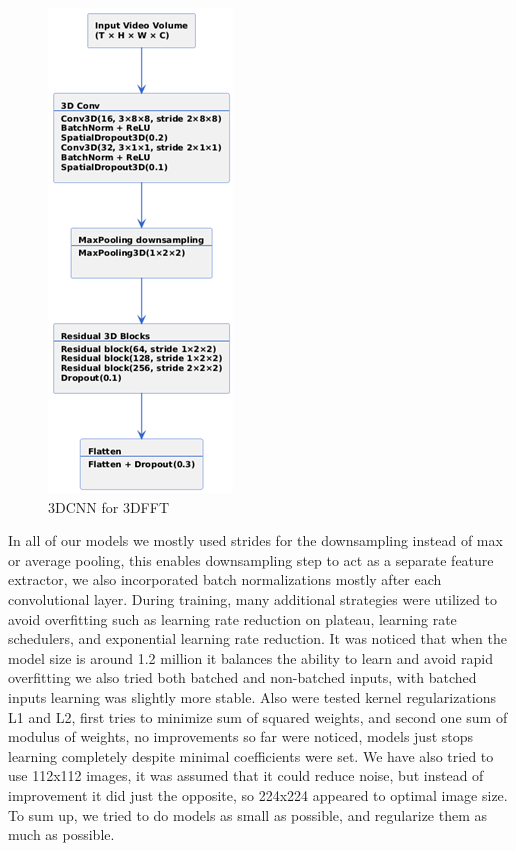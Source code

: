 \documentclass{article}
\begin{document}
\begin{figure}[H]
  \begin{center}
    \includegraphics*[scale=0.8]{Figures/Picture4.png}
  \end{center}
  \caption{3DCNN for 3DFFT}
  \label{fig:fig4}
\end{figure}

In all of our models we mostly used strides for the downsampling instead of max or average pooling, this enables downsampling step to act as a separate feature extractor, we also incorporated batch normalizations mostly after each convolutional layer. During training, many additional strategies were utilized to avoid overfitting such as learning rate reduction on plateau, learning rate schedulers, and exponential learning rate reduction. It was noticed that when the model size is around 1.2 million it balances the ability to learn and avoid rapid overfitting we also tried both batched and non-batched inputs, with batched inputs learning was slightly more stable. Also were tested kernel regularizations L1 and L2, first tries to minimize sum of squared weights, and second one sum of modulus of weights, no improvements so far were noticed, models just stops learning completely despite minimal coefficients were set. We have also tried to use 112x112 images, it was assumed that it could reduce noise, but instead of improvement it did just the opposite, so 224x224 appeared to optimal image size. To sum up, we tried to do models as small as possible, and regularize them as much as possible.
\end{document}
